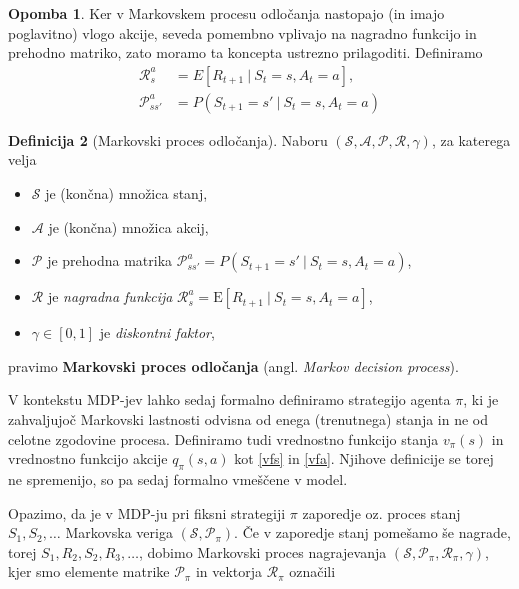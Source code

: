 \documentclass[12pt,a4paper]{amsart}
\theoremstyle{definition} %
\newtheorem{definicija}{Definicija}[section]
\newtheorem{opomba}[definicija]{Opomba}
\theoremstyle{plain} %
\begin{document}
\begin{opomba}
    Ker v Markovskem procesu odločanja nastopajo (in imajo poglavitno) vlogo akcije, seveda pomembno 
    vplivajo na nagradno funkcijo in prehodno matriko, zato moramo ta koncepta ustrezno prilagoditi. 
    Definiramo
    \begin{align*}
    \mathcal{R}_s^a &= E[R_{t+1}~|~S_{t} = s, A_t = a], \\
    \mathcal{P}_{ss'}^a &= P(S_{t+1} = s'~|~S_t = s, A_t = a)
    \end{align*}
\end{opomba}

\begin{definicija}[Markovski proces odločanja]
    Naboru $(\mathcal{S}, \mathcal{A}, \mathcal{P}, \mathcal{R}, \gamma)$, za katerega velja
    \begin{itemize}
        \item $\mathcal{S}$ je (končna) množica stanj,
        \item $\mathcal{A}$ je (končna) množica akcij, 
        \item $\mathcal{P}$ je prehodna matrika $\mathcal{P}_{ss'}^a = P(S_{t+1} = s'~|~
                S_t = s, A_t = a)$, 
        \item $\mathcal{R}$ je \textit{nagradna funkcija} 
                $\mathcal{R}_s^a = \mathrm{E}[R_{t+1}~|~S_{t} = s, A_t = a]$, 
        \item $\gamma \in [0,1]$ je \textit{diskontni faktor}, 
    \end{itemize}
    pravimo \textbf{Markovski proces odločanja} (angl. \textit{Markov decision process}).
\end{definicija}

V kontekstu MDP-jev lahko sedaj formalno definiramo strategijo agenta $\pi$, ki je zahvaljujoč 
Markovski lastnosti odvisna od enega (trenutnega) stanja in ne od celotne zgodovine procesa. 
Definiramo tudi vrednostno funkcijo stanja $v_{\pi}(s)$ in vrednostno funkcijo akcije $q_{\pi}(s, a)$ 
kot \eqref{vfs} in \eqref{vfa}. Njihove definicije se torej ne spremenijo, so pa sedaj formalno 
vmeščene v model.

Opazimo, da je v MDP-ju pri fiksni strategiji $\pi$ zaporedje oz. proces stanj $S_1, S_2, \dots$ 
Markovska veriga $(\mathcal{S}, \mathcal{P}_\pi)$. Če v zaporedje stanj pomešamo še nagrade, 
torej $S_1, R_2, S_2, R_3, \dots$, dobimo Markovski proces nagrajevanja $(\mathcal{S}, 
\mathcal{P}_\pi, \mathcal{R}_\pi, \gamma)$, kjer smo elemente matrike $\mathcal{P}_\pi$ in 
vektorja $\mathcal{R}_\pi$ označili
\end{document}
